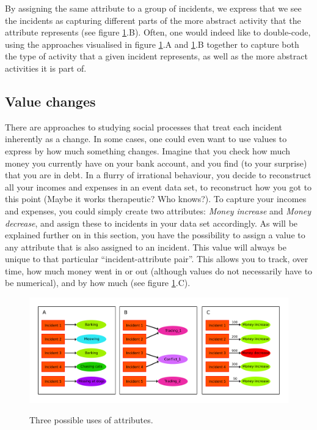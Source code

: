 \documentclass{memoir}
\begin{document}
By assigning the same attribute to a group of incidents, we express that we see the incidents as capturing different parts of the more abstract activity that the attribute represents (see figure \ref{fig:usesofattributes}.B). Often, one would indeed like to double-code, using the approaches visualised in figure \ref{fig:usesofattributes}.A and \ref{fig:usesofattributes}.B together to capture both the type of activity that a given incident represents, as well as the more abstract activities it is part of. 
   

  \subsection{Value changes}
\label{sec:valuechanges}
There are approaches to studying social processes that treat each incident inherently as a change. In some cases, one could even want to use values to express by how much something changes. Imagine that you check how much money you currently have on your bank account, and you find (to your surprise) that you are in debt. In a flurry of irrational behaviour, you decide to reconstruct all your incomes and expenses in an event data set, to reconstruct how you got to this point (Maybe it works therapeutic? Who knows?). To capture your incomes and expenses, you could simply create two attributes: \emph{Money increase} and \emph{Money decrease}, and assign these to incidents in your data set accordingly. As will be explained further on in this section, you have the possibility to assign a value to any attribute that is also assigned to an incident. This value will always be unique to that particular ``incident-attribute pair''. This allows you to track, over time, how much money went in or out (although values do not necessarily have to be numerical), and by how much (see figure \ref{fig:usesofattributes}.C).

\begin{figure}[h!]
  \centering
  \caption{Three possible uses of attributes.}
  \includegraphics[width=120mm]{Diagram_3.pdf}
  \label{fig:usesofattributes}
\end{figure}
\end{document}

